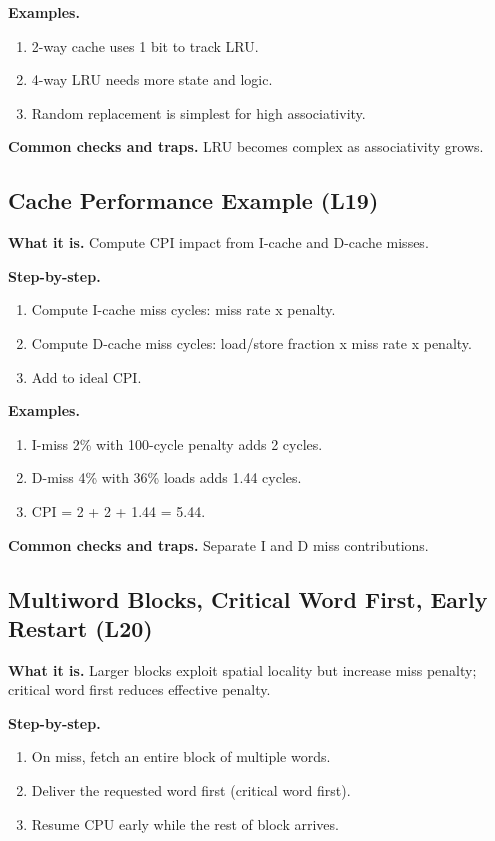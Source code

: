 \documentclass[11pt]{article}
\begin{document}
\textbf{Examples.}
\begin{enumerate}[leftmargin=*]
  \item 2-way cache uses 1 bit to track LRU.
  \item 4-way LRU needs more state and logic.
  \item Random replacement is simplest for high associativity.
\end{enumerate}

\textbf{Common checks and traps.} LRU becomes complex as associativity grows.

\subsection{Cache Performance Example (L19)}
\textbf{What it is.} Compute CPI impact from I-cache and D-cache misses.

\textbf{Step-by-step.}
\begin{enumerate}[leftmargin=*]
  \item Compute I-cache miss cycles: miss rate x penalty.
  \item Compute D-cache miss cycles: load/store fraction x miss rate x penalty.
  \item Add to ideal CPI.
\end{enumerate}

\textbf{Examples.}
\begin{enumerate}[leftmargin=*]
  \item I-miss 2\% with 100-cycle penalty adds 2 cycles.
  \item D-miss 4\% with 36\% loads adds 1.44 cycles.
  \item CPI = 2 + 2 + 1.44 = 5.44.
\end{enumerate}

\textbf{Common checks and traps.} Separate I and D miss contributions.

\subsection{Multiword Blocks, Critical Word First, Early Restart (L20)}
\textbf{What it is.} Larger blocks exploit spatial locality but increase miss penalty; critical word first reduces effective penalty.

\textbf{Step-by-step.}
\begin{enumerate}[leftmargin=*]
  \item On miss, fetch an entire block of multiple words.
  \item Deliver the requested word first (critical word first).
  \item Resume CPU early while the rest of block arrives.
\end{enumerate}
\end{document}
